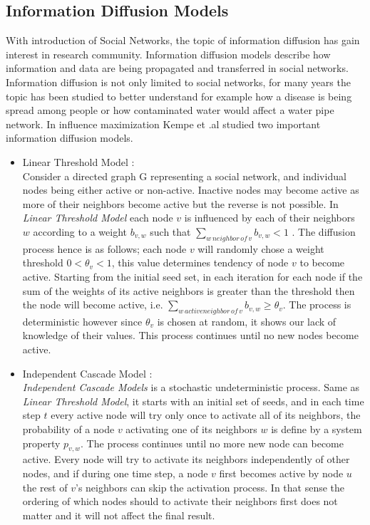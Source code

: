 \documentclass[english]{tktltiki}
\begin{document}
\subsection{Information Diffusion Models}
With introduction of Social Networks, the topic of information diffusion has gain interest in research community. Information diffusion models describe how information and data are being propagated and transferred in social networks. Information diffusion is not only limited to social networks, for many years the topic has been studied to better understand for example how a disease is being spread among people or how contaminated water would affect a water pipe network. In influence maximization Kempe et .al \cite{kempe03}  studied two important information diffusion models.
\begin{itemize}

\item Linear Threshold Model :\\
Consider a directed graph G representing a social network, and individual nodes being either active or non-active. Inactive nodes may become active as more of their neighbors become active but the reverse is not possible. In \textit{Linear Threshold Model} each node $v$ is influenced by each of their neighbors $w$ according to a weight $b_{v,w}$ such that $\sum \nolimits_{w \, neighbor \, of \, v} b_{v,w} < 1$ . The diffusion process hence is as follows; each node $v$ will randomly chose a weight threshold $0 < \theta_v<1 $, this value determines tendency of node $v$ to become active. Starting from the initial seed set, in each iteration for each node if the sum of the weights of its active neighbors is greater than the threshold then the node will become active, i.e. $\sum \nolimits_{w \, active neighbor \, of \, v} b_{v,w}  \geq \theta_v $. The process is deterministic however since $\theta_v$ is chosen at random, it shows our lack of knowledge of their values. This process continues until no new nodes become active.

\item Independent Cascade Model :\\ 
 \textit{Independent Cascade Models} is a stochastic undeterministic process. Same as \textit{Linear Threshold Model}, it starts with an initial set of seeds, and in each time step $t$ every active node will try only once to activate all of its neighbors, the probability of a node $v$ activating one of its neighbors $w$ is define by a system property $p_{v,w}$. The process continues until no more new node can become active. Every node will try to activate its neighbors independently of other nodes, and if during one time step, a node $v$ first becomes active by node $u$ the rest of $v$'s neighbors can skip the activation process. In that sense the ordering of which nodes should to activate their neighbors first does not matter and it will not affect the final result.
\end{itemize}
\end{document}
